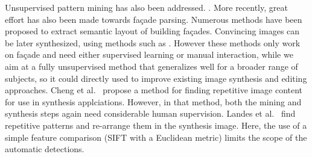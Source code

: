 \documentclass{acmtog}
\begin{document}
Unsupervised pattern mining has also been addressed.  . More recently, great effort has also been made towards fa{\c{c}}ade parsing. Numerous methods \cite{Teboul2011SG,Martinovic2012AT,Bao2013PF} have been proposed to extract semantic layout of building fa{\c{c}}ades. Convincing images can be later synthesized, using methods such as \cite{Dai2013Facade}. However these methods only work on fa{\c{c}}ade and need either supervised learning or manual interaction, while we aim at a fully unsupervised method that generalizes well for a broader range of subjects, so it could  directly used to improve existing image synthesis and editing approaches. 
Cheng et al.~\cite{Cheng2010RepFinder} propose a method for finding repetitive image content for use in synthesis applciations. However, in that method, both the mining and synthesis steps again need considerable human supervision. Landes et al.~\cite{Landes2009} find repetitive patterns and re-arrange them in the synthesis image. Here, the use of a simple feature comparison (SIFT with a Euclidean metric) limits the scope of the automatic detections.
\end{document}
